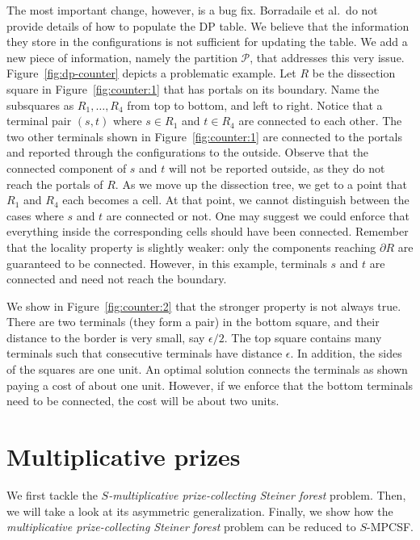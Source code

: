 \documentclass[extras,11pt]{article} \usepackage{fullpage}
\theoremstyle{mytheorem}
\newcommand{\eps}{\epsilon}
\newcommand{\prob}[1]{\textit{#1}}
\begin{document}
The most important change, however, is a bug fix.
Borradaile et al.\ do not provide details of how to populate the DP  table.
We believe that the information they store in the configurations is not sufficient for updating the table.
We add a new piece of information, namely the partition $\mathcal{P}$, that addresses this very issue.
Figure~\ref{fig:dp-counter} depicts a problematic example.
Let $R$ be the dissection square in Figure~\ref{fig:counter:1} that has portals on its boundary.
Name the subsquares as $R_1, \dots, R_4$ from top to bottom, and left to right.
Notice that a terminal pair $(s,t)$ where $s\in R_1$ and $t\in R_4$ are connected to each other.
The two other terminals shown in Figure~\ref{fig:counter:1} are connected to the portals and reported through the configurations to the outside.
Observe that the connected component of $s$ and $t$ will not be reported outside, as they do not reach the portals of $R$.
As we move up the dissection tree, we get to a point that $R_1$ and $R_4$ each becomes a cell.
At that point, we cannot distinguish between the cases where $s$ and $t$ are connected or not.
One may suggest we could enforce that everything inside the corresponding cells should have been connected.
Remember that the locality property is slightly weaker: only the components reaching $\partial R$ are guaranteed to be connected.
However, in this example, terminals $s$ and $t$ are connected and need not reach the boundary.

We show in Figure~\ref{fig:counter:2} that the stronger property is not always true.
There are two terminals (they form a pair) in the bottom square,
and their distance to the border is very small, say $\eps/2$.
The top square contains many terminals such that consecutive terminals have distance $\eps$.
In addition, the sides of the squares are one unit.
An optimal solution connects the terminals as shown paying a cost of about one unit.
However, if we enforce that the bottom terminals need to be connected, the cost will be about two units.
\fi







\section{Multiplicative prizes}\label{sec:multi}

We first tackle the \prob{$S$-multiplicative prize-collecting Steiner forest} problem.
Then, we will take a look at its asymmetric generalization.
Finally, we show how the \prob{multiplicative prize-collecting Steiner forest} problem can be reduced to $S$-MPCSF.
\end{document}
